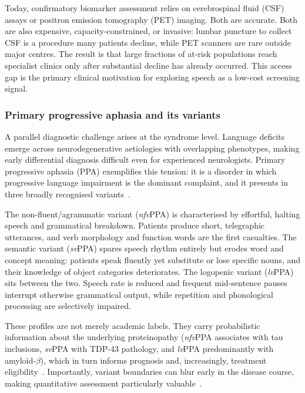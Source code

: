 Today, confirmatory biomarker assessment relies on cerebrospinal fluid (CSF) assays or positron emission tomography (PET) imaging.
Both are accurate.
Both are also expensive, capacity-constrained, or invasive: lumbar puncture to collect CSF is a procedure many patients decline, while PET scanners are rare outside major centres.
The result is that large fractions of at-risk populations reach specialist clinics only after substantial decline has already occurred.
This access gap is the primary clinical motivation for exploring speech as a low-cost screening signal.

\subsubsection{Primary progressive aphasia and its variants}
\label{ssec:ppa}

A parallel diagnostic challenge arises at the syndrome level.
Language deficits emerge across neurodegenerative aetiologies with overlapping phenotypes, making early differential diagnosis difficult even for experienced neurologists.
Primary progressive aphasia (PPA) exemplifies this tension: it is a disorder in which progressive language impairment is the dominant complaint, and it presents in three broadly recognised variants~\cite{gorno2011ppa,gorno2015ppa}.

The non-fluent/agrammatic variant (\textit{nfv}PPA) is characterised by effortful, halting speech and grammatical breakdown.
Patients produce short, telegraphic utterances, and verb morphology and function words are the first casualties.
The semantic variant (\textit{sv}PPA) spares speech rhythm entirely but erodes word and concept meaning: patients speak fluently yet substitute or lose specific nouns, and their knowledge of object categories deteriorates.
The logopenic variant (\textit{lv}PPA) sits between the two.
Speech rate is reduced and frequent mid-sentence pauses interrupt otherwise grammatical output, while repetition and phonological processing are selectively impaired.

These profiles are not merely academic labels.
They carry probabilistic information about the underlying proteinopathy (\textit{nfv}PPA associates with tau inclusions, \textit{sv}PPA with TDP-43 pathology, and \textit{lv}PPA predominantly with amyloid-$\beta$), which in turn informs prognosis and, increasingly, treatment eligibility~\cite{elahi2017clinicopath}.
Importantly, variant boundaries can blur early in the disease course, making quantitative assessment particularly valuable~\cite{macoir2025rethinkingppa}.

